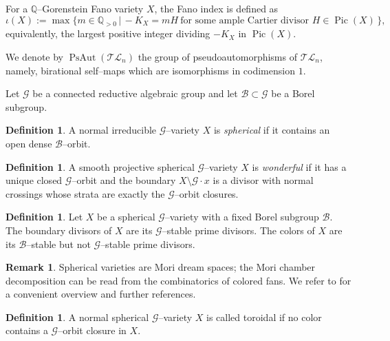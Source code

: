\documentclass[10pt]{amsart}
\theoremstyle{definition}
\newtheorem{definition}[theorem]{Definition}
\newtheorem{remark}[theorem]{Remark}
\newcommand{\Pic}{\operatorname{Pic}}
\newcommand{\PsAut}{\operatorname{PsAut}}
\newcommand{\TL}{\mathcal{TL}}
\newcommand{\QQ}{\mathbb{Q}}
\theoremstyle{plain} %
\begin{document}
For a $\QQ$--Gorenstein Fano variety $X$, the Fano index is defined as
\[
\iota(X):= \max\bigl\{m\in\QQ_{>0}\, \big|\, -K_X= mH\ \text{for some ample Cartier divisor }H\in\Pic(X)\,\bigr\},
\]
equivalently, the largest positive integer dividing $-K_X$ in $\Pic(X)$.

We denote by $\PsAut(\TL_n)$ the group of pseudoautomorphisms of $\TL_n$, namely, birational
self--maps which are isomorphisms in codimension $1$. 


Let $\mathscr{G}$ be a connected reductive algebraic group and let $\mathscr{B}\subset \mathscr{G}$ be a Borel subgroup.

\begin{definition}
A normal irreducible $\mathscr{G}$--variety $X$ is \emph{spherical} if it contains an open dense $\mathscr{B}$--orbit.
\end{definition}

\begin{definition}
A smooth projective spherical $\mathscr{G}$--variety $X$ is \emph{wonderful} if it has a unique closed $\mathscr{G}$--orbit and the boundary
$X\setminus \mathscr{G}\cdot x$ is a divisor with normal crossings whose strata are exactly the $\mathscr{G}$--orbit closures.
\end{definition}

\begin{definition}
Let $X$ be a spherical $\mathscr{G}$--variety with a fixed Borel subgroup $\mathscr{B}$. The boundary divisors of $X$ are its $\mathscr{G}$--stable prime divisors. The colors of $X$ are its $\mathscr{B}$--stable but not $\mathscr{G}$--stable prime divisors.
\end{definition}

\begin{remark}\label{sphMDS}
Spherical varieties are Mori dream spaces; the Mori chamber decomposition can be read from the combinatorics of colored fans.
We refer to \cite[Section~4]{Pe14} for a convenient overview and further references.
\end{remark}


\begin{definition}\label{def:toroidal}
A normal spherical $\mathscr{G}$--variety $X$ is called toroidal if no color contains a $\mathscr{G}$--orbit closure in $X$.
\end{definition}
\end{document}
